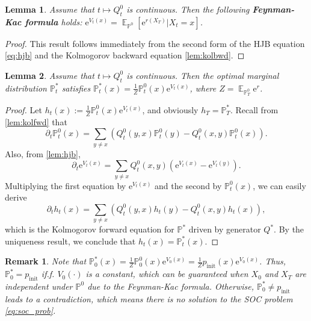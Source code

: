 \documentclass{article}
\newtheorem{lemma}{Lemma}
\newtheorem{remark}{Remark}
\theoremstyle{remark}
\newcommand{\e}{\mathrm{e}}
\renewcommand{\P}{\mathbb{P}}
\newcommand{\E}{\operatorname{\mathbb{E}}}
\newcommand{\pinit}{p_\mathrm{init}}
\begin{document}
\begin{lemma}
    Assume that $t\mapsto Q^0_t$ is continuous. Then the following \textbf{Feynman-Kac formula} holds: $\e^{V_t(x)}=\E_{\P^0}[\e^{r(X_T)}|X_t=x]$.
    \label{lem:fk}
\end{lemma}
\begin{proof}
This result follows immediately from the second form of the HJB equation \cref{eq:hjb} and the Kolmogorov backward equation \cref{lem:kolbwd}. 
\end{proof}


\begin{lemma}
    Assume that $t\mapsto Q^0_t$ is continuous. Then the optimal marginal distribution $\P^*_t$ satisfies $\P^*_t(x)=\frac{1}{Z}\P^0_t(x)\e^{V_t(x)}$, where $Z=\E_{\P^0_T}\e^r$.
    \label{lem:p_star_t}
\end{lemma}
\begin{proof}
Let $h_t(x):=\frac{1}{Z}\P^0_t(x)\e^{V_t(x)}$, and obviously $h_T=\P^*_T$. Recall from \cref{lem:kolfwd} that
$$\partial_t\P^0_t(x)=\sum_{y\ne x}(Q^0_t(y,x)\P^0_t(y)-Q^0_t(x,y)\P^0_t(x)).$$
Also, from \cref{lem:hjb},
$$\partial_t\e^{V_t(x)}=\sum_{y\ne x}Q^0_t(x,y)(\e^{V_t(x)}-\e^{V_t(y)}).$$
Multiplying the first equation by $\e^{V_t(x)}$ and the second by $\P^0_t(x)$, we can easily derive
$$\partial_t h_t(x) = \sum_{y\ne x}(Q^0_t(y,x)h_t(y)-Q^0_t(x,y)h_t(x)),$$
which is the Kolmogorov forward equation for $\P^*$ driven by generator $Q^*$. By the uniqueness result, we conclude that $h_t(x)=\P^*_t(x)$.
\end{proof}


\begin{remark}
    Note that $\P^*_0(x)=\frac{1}{Z}\P^0_0(x)\e^{V_0(x)}=\frac{1}{Z}\pinit(x)\e^{V_0(x)}$. Thus, $\P^*_0=\pinit$ if.f. $V_0(\cdot)$ is a constant, which can be guaranteed when $X_0$ and $X_T$ are independent under $\P^0$ due to the Feynman-Kac formula. Otherwise, $\P^*_0\ne\pinit$ leads to a contradiction, which means there is no solution to the SOC problem \cref{eq:soc_prob}.  
\end{remark}
\end{document}
